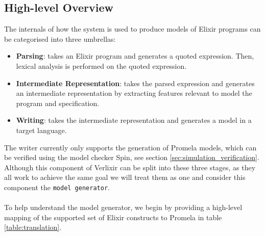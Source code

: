 \subsection{High-level Overview}
The internals of how the system is used to produce models of Elixir programs can be categorised into three umbrellas:
\begin{itemize}
    \item \textbf{Parsing}: takes an Elixir program and generates a quoted expression. Then, lexical analysis is performed on the quoted expression.
    \item \textbf{Intermediate Representation}: takes the parsed expression and generates an intermediate representation by extracting features relevant to model the program and specification.
    \item \textbf{Writing}: takes the intermediate representation and generates a model in a target language.
\end{itemize} 
The writer currently only supports the generation of Promela models, which can be verified using the model checker Spin, see section \ref{sec:simulation_verification}. Although this component of Verlixir can be split into these three stages, as they all work to achieve the same goal we will treat them as one and consider this component the \texttt{model generator}. 
\\ \\
To help understand the model generator, we begin by providing a high-level mapping of the supported set of Elixir constructs to Promela in table \ref{table:translation}.
\\ \\
